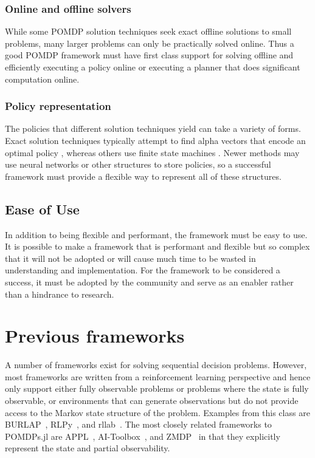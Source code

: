 \subsubsection{Online and offline solvers}

While some POMDP solution techniques seek exact offline solutions to small problems, many larger problems can only be practically solved online.
Thus a good POMDP framework must have first class support for solving offline and efficiently executing a policy online or executing a planner that does significant computation online.

\subsubsection{Policy representation}

The policies that different solution techniques yield can take a variety of forms.
Exact solution techniques typically attempt to find alpha vectors that encode an optimal policy \cite{kaelbling1998planning,kurniawati2008sarsop}, whereas others use finite state machines \cite{bai2010mcvi}.
Newer methods may use neural networks \cite{karkus2017qmdp} or other structures to store policies, so a successful framework must provide a flexible way to represent all of these structures.

\subsection{Ease of Use}

In addition to being flexible and performant, the framework must be easy to use.
It is possible to make a framework that is performant and flexible but so complex that it will not be adopted or will cause much time to be wasted in understanding and implementation.
For the framework to be considered a success, it must be adopted by the community and serve as an enabler rather than a hindrance to research.

\section{Previous frameworks}

A number of frameworks exist for solving sequential decision problems.
However, most frameworks are written from a reinforcement learning perspective and hence only support either fully observable problems or problems where the state is fully observable, or environments that can generate observations but do not provide access to the Markov state structure of the problem.
Examples from this class are BURLAP~\cite{diuk2008object}, RLPy~\cite{geramifard2015rlpy}, and rllab~\cite{duan2016benchmarking}.
The most closely related frameworks to POMDPs.jl are APPL~\citep{appl}, AI-Toolbox~\citep{aitoolbox}, and ZMDP~\citep{zmdp} in that they explicitly represent the state and partial observability.

